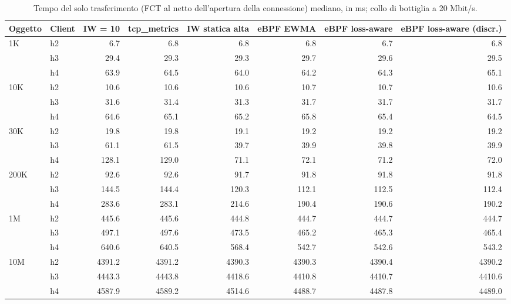 \begin{table}[htbp]
  \centering
  \caption{Tempo del solo trasferimento (FCT al netto dell'apertura della connessione) mediano, in ms; collo di bottiglia a 20 Mbit/s.}
  \label{tab:trasf-med-20}
  \begin{tabular}{llrrrrrr}
    \toprule
    Oggetto & Client & IW = 10 & tcp\_metrics & IW statica alta & eBPF EWMA & eBPF loss-aware & eBPF loss-aware (discr.) \\
    \midrule
    1K & h2 & 6.7 & 6.8 & 6.8 & 6.8 & 6.7 & 6.8 \\
     & h3 & 29.4 & 29.3 & 29.3 & 29.7 & 29.6 & 29.5 \\
     & h4 & 63.9 & 64.5 & 64.0 & 64.2 & 64.3 & 65.1 \\
    \addlinespace
    10K & h2 & 10.6 & 10.6 & 10.6 & 10.7 & 10.7 & 10.6 \\
     & h3 & 31.6 & 31.4 & 31.3 & 31.7 & 31.7 & 31.7 \\
     & h4 & 64.6 & 65.1 & 65.2 & 65.8 & 65.4 & 64.5 \\
    \addlinespace
    30K & h2 & 19.8 & 19.8 & 19.1 & 19.2 & 19.2 & 19.2 \\
     & h3 & 61.1 & 61.5 & 39.7 & 39.9 & 39.8 & 39.9 \\
     & h4 & 128.1 & 129.0 & 71.1 & 72.1 & 71.2 & 72.0 \\
    \addlinespace
    200K & h2 & 92.6 & 92.6 & 91.7 & 91.8 & 91.8 & 91.8 \\
     & h3 & 144.5 & 144.4 & 120.3 & 112.1 & 112.5 & 112.4 \\
     & h4 & 283.6 & 283.1 & 214.6 & 190.4 & 190.6 & 190.2 \\
    \addlinespace
    1M & h2 & 445.6 & 445.6 & 444.8 & 444.7 & 444.7 & 444.7 \\
     & h3 & 497.1 & 497.6 & 473.5 & 465.2 & 465.3 & 465.4 \\
     & h4 & 640.6 & 640.5 & 568.4 & 542.7 & 542.6 & 543.2 \\
    \addlinespace
    10M & h2 & 4391.2 & 4391.2 & 4390.3 & 4390.3 & 4390.4 & 4390.2 \\
     & h3 & 4443.3 & 4443.8 & 4418.6 & 4410.8 & 4410.7 & 4410.6 \\
     & h4 & 4587.9 & 4589.2 & 4514.6 & 4488.7 & 4487.8 & 4489.0 \\
    \bottomrule
  \end{tabular}
\end{table}

